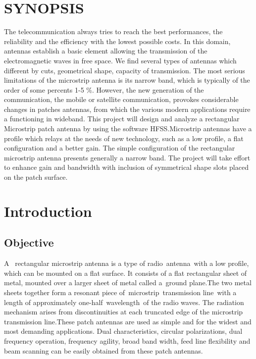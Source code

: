 \documentclass[12pt]{article}
\begin{document}
\tableofcontents
\thispagestyle{empty}
\cleardoublepage
\listoffigures
\thispagestyle{empty}
\cleardoublepage
{}


\section*{SYNOPSIS}
\justify
The telecommunication always tries to reach the best performances, the reliability and the efficiency with the lowest possible costs. In this domain, antennas establish a basic element allowing the transmission of the electromagnetic waves in free space. We find several types of antennas which different by cuts, geometrical shape, capacity of transmission. The most serious limitations of the microstrip antenna is its narrow band, which is typically of the order of some percents 1-5 \%. However, the new generation of the communication, the mobile or satellite communication, provokes considerable changes in patches antennas, from which the various modern applications require a functioning in wideband.
This  project will design and analyze a rectangular Microstrip patch antenna by using the software HFSS.Microstrip antennas have a profile which relays at the needs of new technology, such as a low profile, a flat configuration and a better gain. The simple configuration of the rectangular microstrip antenna presents generally a narrow band. The project will take effort to enhance gain and bandwidth with inclusion of symmetrical shape slots placed on the patch surface.
\thispagestyle{empty}
\cleardoublepage





\setcounter{page}{1}
\section{Introduction}\label{sec:Introduction}


\subsection{Objective}\label{subs:Objective}
 \justify
   A  rectangular microstrip antenna is a type of radio antenna with a low profile, which can be mounted on a flat surface. It consists of a flat rectangular sheet of metal, mounted over a larger sheet of metal called a ground plane.The two metal sheets together form a resonant piece of microstrip transmission line with a length of approximately one-half wavelength of the radio waves. The radiation mechanism arises from discontinuities at each truncated edge of the microstrip transmission line.These patch antennas are used as simple and for the widest and most demanding applications. Dual characteristics, circular polarizations, dual frequency operation, frequency agility, broad band width, feed line flexibility and beam scanning can be easily obtained from these patch antennas.
\end{document}
